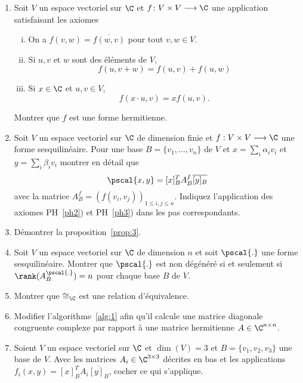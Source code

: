 \begin{enumerate}
\item Soit $V$ un espace vectoriel sur $\C$ et $f\colon V\times V \longrightarrow \C$ une application satisfaisant les axiomes 

  \begin{enumerate}[i)] 
  \item On a $f({v,w}) = \overline{f({w,v})}$ pour tout $v,w \in V$.  
  \item Si $u,v$ et $w$ sont des éléments de $V$,  
    \begin{displaymath}
      f({u,v+w}) = f({u,v}) +f({u,w}) 
    \end{displaymath}
  \item Si $x \in \C$ et $u,v \in V$, 
    \begin{displaymath}
      f({x \cdot u , v}) = x f({u,v}). 
    \end{displaymath}  
  \end{enumerate}
Montrer que $f$ est une forme hermitienne. 
\item Soit $V$ un espace vectoriel sur $\C$ de dimension finie et $f: V \times V \longrightarrow \C$ une forme sesquilinéaire. Pour une base  $B = \{v_1,\dots,v_n\}$ de $V$ et $x = \sum_i \alpha_i v_i$ et $y = \sum_i \beta_i v_i$ montrer en détail que 
  \begin{displaymath}
  \pscal{x,y} = [x]_B ^T A_B^{f} \overline{[y]_B} 
\end{displaymath}
avec la matrice $A_B^f = (f(v_i,v_j))_{1 \leq i,j \leq n}$. Indiquez l'application des axiomes PH~\ref{ph2}) et PH~\ref{ph3}) dans les pas correspondants. 
\item Démontrer la proposition~\ref{prop:3}. 
\item Soit $V$ un espace vectoriel sur $\C$ de dimension $n$ et soit $\pscal{.}$ une forme sesquilinéaire. Montrer que $\pscal{.}$ est non dégénéré si et seulement si $\rank(A_B^{\pscal{.}}) = n$  pour chaque base $B$ de $V$. 
\item Montrer que $\cong_\C$ est une relation d'équivalence. \label{item:6}
\item Modifier l'algorithme~\ref{alg:1} afin qu'il calcule une matrice diagonale congruente complexe par rapport à une matrice hermitienne $A \in \C^{n \times n}$. \label{item:7}
\item Soient $V$ un espace vectoriel sur $\C$ et $\dim(V) = 3$ et $B = \{v_1,v_2,v_3\}$ une base de $V$. Avec les matrices $A_i \in \C^{3\times 3}$ décrites en bas et les applications  $f_i(x,y) = [x]_B^T A_i \overline{[y]_B}$, cocher ce qui s'applique.  



\end{enumerate}
